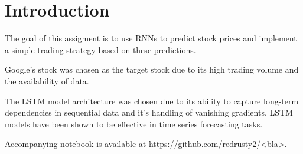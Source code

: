 \section{Introduction}
\label{sec:intro}

The goal of this assigment is to use RNNs to predict stock prices and implement a simple trading strategy based on these predictions. 

Google's stock \cite{goog} was chosen as the target stock due to its high trading volume and the availability of data. 

The LSTM model architecture was chosen due to its ability to capture long-term dependencies in sequential data and it's handling of vanishing gradients. LSTM models have been shown to be effective in time series forecasting tasks\cite{lstm}.

Accompanying notebook is available at \url{https://github.com/redrusty2/<bla>}.
